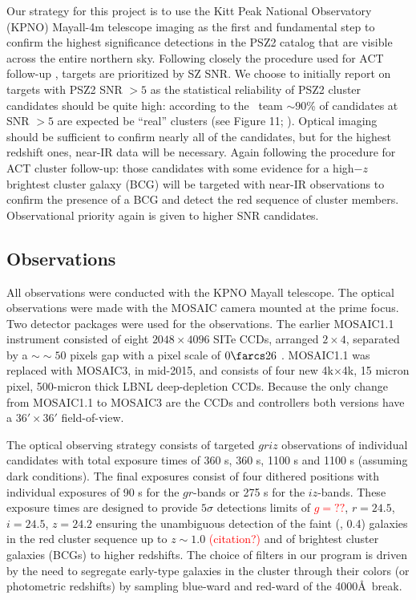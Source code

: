 \documentclass[apj, revtex4-1]{emulateapj}
\newcommand{\editorial}[1]{\textcolor{red}{#1}}
\begin{document}
Our strategy for this project is to use the Kitt Peak National Observatory (KPNO) Mayall-4m telescope imaging as the first and fundamental step to confirm the highest significance detections in the PSZ2 catalog that are visible across the entire northern sky.
%
%
Following closely the procedure used for ACT follow-up , targets are prioritized by SZ SNR. We choose to initially report on targets with PSZ2 SNR $>5$ as the statistical reliability of PSZ2 cluster candidates should be quite high: according to the \planck\ team $\sim90$\% of candidates at SNR $>5$ are expected be ``real'' clusters (see Figure 11; \citealt{PlanckCollaboration2015a}).
%
Optical imaging should be sufficient to confirm nearly all of the candidates, but for the highest redshift ones, near-IR data will be necessary. Again following the procedure for ACT cluster follow-up: those candidates with some evidence for a high$-z$ brightest cluster galaxy (BCG) will be targeted with near-IR observations to confirm the presence of a BCG and detect the red sequence of cluster members. Observational priority again is given to higher SNR candidates.

\subsection{Observations}\label{sec: observations}
All observations were conducted with the KPNO Mayall telescope. The optical observations were made with the MOSAIC camera mounted at the prime focus. Two detector packages were used for the observations. The earlier MOSAIC1.1 instrument consisted of eight $2048\times4096$ SITe CCDs, arranged $2\times4$, separated by a $∼\sim50$ pixels gap with a pixel scale of $0\farcs26$ \perpixel. MOSAIC1.1 was replaced with MOSAIC3, in mid-2015, and consists of four new 4k$\times$4k, 15 micron pixel, 500-micron thick LBNL deep-depletion CCDs. Because the only change from MOSAIC1.1 to MOSAIC3 are the CCDs and controllers both versions have a $36' \times 36'$ field-of-view.

The optical observing strategy consists of targeted $griz$ observations of individual candidates with total exposure times of 360 s, 360 s, 1100 s and 1100 s (assuming dark conditions). The final exposures consist of four dithered positions with individual exposures of 90 s for the $gr$-bands or 275 s for the $iz$-bands. These exposure times are designed to provide $5\sigma$ detections limits of \editorial{$g=??$}, $r = 24.5$, $i = 24.5$, $z = 24.2$ ensuring the unambiguous detection of the faint (\ie, 0.4\lstar) galaxies in the red cluster sequence up to $z \sim 1.0$ \editorial{(citation?)} and of brightest cluster galaxies (BCGs) to higher redshifts. The choice of filters in our program is driven by the need to segregate early-type galaxies in the cluster through their colors (or photometric redshifts) by sampling blue-ward and red-ward of the 4000\AA\ break.
\end{document}
